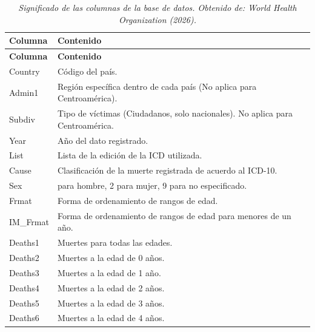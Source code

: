 \documentclass[
  letterpaper,
  DIV=11,
  numbers=noendperiod]{scrartcl}
\begin{document}
\begin{longtable}[]{@{}
  >{\raggedright\arraybackslash}p{}
  >{\raggedright\arraybackslash}p{}@{}}
\caption{\emph{Significado de las columnas de la base de datos. Obtenido
de: World Health Organization (2026).}}\tabularnewline
\toprule\noalign{}
\begin{minipage}[b]{\linewidth}\raggedright
\textbf{Columna}
\end{minipage} & \begin{minipage}[b]{\linewidth}\raggedright
\textbf{Contenido}
\end{minipage} \\
\midrule\noalign{}
\endfirsthead
\toprule\noalign{}
\begin{minipage}[b]{\linewidth}\raggedright
\textbf{Columna}
\end{minipage} & \begin{minipage}[b]{\linewidth}\raggedright
\textbf{Contenido}
\end{minipage} \\
\midrule\noalign{}
\endhead
\bottomrule\noalign{}
\endlastfoot
Country & Código del país. \\
Admin1 & Región específica dentro de cada país (No aplica para
Centroamérica). \\
Subdiv & Tipo de víctimas (Ciudadanos, solo nacionales). No aplica para
Centroamérica. \\
Year & Año del dato registrado. \\
List & Lista de la edición de la ICD utilizada. \\
Cause & Clasificación de la muerte registrada de acuerdo al ICD-10. \\
Sex & 1 para hombre, 2 para mujer, 9 para no especificado. \\
Frmat & Forma de ordenamiento de rangos de edad. \\
IM\_Frmat & Forma de ordenamiento de rangos de edad para menores de un
año. \\
Deaths1 & Muertes para todas las edades. \\
Deaths2 & Muertes a la edad de 0 años. \\
Deaths3 & Muertes a la edad de 1 año. \\
Deaths4 & Muertes a la edad de 2 años. \\
Deaths5 & Muertes a la edad de 3 años. \\
Deaths6 & Muertes a la edad de 4 años. \\

\end{longtable}
\end{document}
